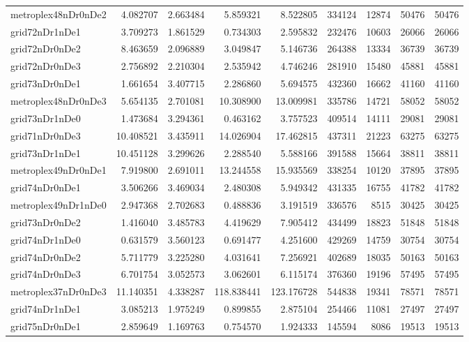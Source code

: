 \documentclass[../../../thesis.tex]{subfiles}
\begin{document}
\begin{longtable}{|l|r|r|r|r|r|r|r|r|}
metroplex48nDr0nDe2 & 4.082707 & 2.663484 & 5.859321 & 8.522805 & 334124 & 12874 & 50476 & 50476 \\
grid72nDr1nDe1 & 3.709273 & 1.861529 & 0.734303 & 2.595832 & 232476 & 10603 & 26066 & 26066 \\
grid72nDr0nDe2 & 8.463659 & 2.096889 & 3.049847 & 5.146736 & 264388 & 13334 & 36739 & 36739 \\
grid72nDr0nDe3 & 2.756892 & 2.210304 & 2.535942 & 4.746246 & 281910 & 15480 & 45881 & 45881 \\
grid73nDr0nDe1 & 1.661654 & 3.407715 & 2.286860 & 5.694575 & 432360 & 16662 & 41160 & 41160 \\
metroplex48nDr0nDe3 & 5.654135 & 2.701081 & 10.308900 & 13.009981 & 335786 & 14721 & 58052 & 58052 \\
grid73nDr1nDe0 & 1.473684 & 3.294361 & 0.463162 & 3.757523 & 409514 & 14111 & 29081 & 29081 \\
grid71nDr0nDe3 & 10.408521 & 3.435911 & 14.026904 & 17.462815 & 437311 & 21223 & 63275 & 63275 \\
grid73nDr1nDe1 & 10.451128 & 3.299626 & 2.288540 & 5.588166 & 391588 & 15664 & 38811 & 38811 \\
metroplex49nDr0nDe1 & 7.919800 & 2.691011 & 13.244558 & 15.935569 & 338254 & 10120 & 37895 & 37895 \\
grid74nDr0nDe1 & 3.506266 & 3.469034 & 2.480308 & 5.949342 & 431335 & 16755 & 41782 & 41782 \\
metroplex49nDr1nDe0 & 2.947368 & 2.702683 & 0.488836 & 3.191519 & 336576 & 8515 & 30425 & 30425 \\
grid73nDr0nDe2 & 1.416040 & 3.485783 & 4.419629 & 7.905412 & 434499 & 18823 & 51848 & 51848 \\
grid74nDr1nDe0 & 0.631579 & 3.560123 & 0.691477 & 4.251600 & 429269 & 14759 & 30754 & 30754 \\
grid74nDr0nDe2 & 5.711779 & 3.225280 & 4.031641 & 7.256921 & 402689 & 18035 & 50163 & 50163 \\
grid74nDr0nDe3 & 6.701754 & 3.052573 & 3.062601 & 6.115174 & 376360 & 19196 & 57495 & 57495 \\
metroplex37nDr0nDe3 & 11.140351 & 4.338287 & 118.838441 & 123.176728 & 544838 & 19341 & 78571 & 78571 \\
grid74nDr1nDe1 & 3.085213 & 1.975249 & 0.899855 & 2.875104 & 254466 & 11081 & 27497 & 27497 \\
grid75nDr0nDe1 & 2.859649 & 1.169763 & 0.754570 & 1.924333 & 145594 & 8086 & 19513 & 19513 \\

\end{longtable}
\end{document}
